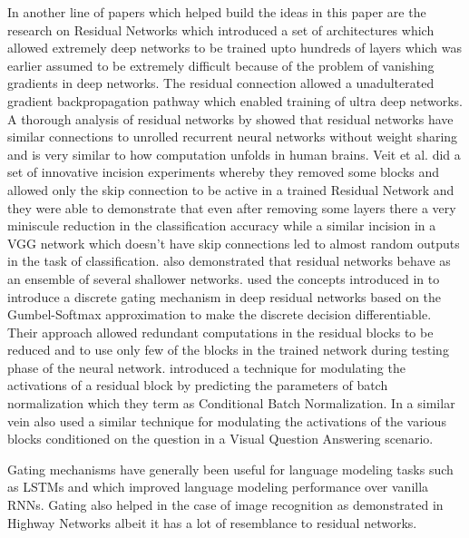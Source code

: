 In another line of papers which helped build the ideas in this paper are the research on Residual Networks \cite{he2016deep} which introduced a set of architectures which allowed extremely deep networks to be trained upto hundreds of layers which was earlier assumed to be extremely difficult because of the problem of vanishing gradients in deep networks. The residual connection allowed a unadulterated gradient backpropagation pathway which enabled training of ultra deep networks. A thorough analysis of residual networks by \cite{liao2016bridging} showed that residual networks have similar connections to unrolled recurrent neural networks without weight sharing and is very similar to how computation unfolds in human brains. Veit et al. \cite{veit2016residual} did a set of innovative incision experiments whereby they removed some blocks and allowed only the skip connection to be active in a trained Residual Network and they were able to demonstrate that even after removing some layers there a very miniscule reduction in the classification accuracy while a similar incision in a VGG network \cite{simonyan2014very} which doesn't have skip connections led to almost random outputs in the task of classification. \cite{veit2016residual} also demonstrated that residual networks behave as an ensemble of several shallower networks. \cite{veit2018adaptive} used the concepts introduced in \cite{veit2016residual} to introduce a discrete gating mechanism in deep residual networks based on the Gumbel-Softmax approximation to make the discrete decision differentiable. Their approach allowed redundant computations in the residual blocks to be reduced and to use only few of the blocks in the trained network during testing phase of the neural network. \cite{de2017modulating} introduced a technique for modulating the activations of a residual block by predicting the parameters of batch normalization which they term as Conditional Batch Normalization. In a similar vein \cite{perez2017film} also used a similar technique for modulating the activations of the various blocks conditioned on the question in a Visual Question Answering scenario.

Gating mechanisms have generally been useful for language modeling tasks such as LSTMs \cite{Hochreiter1997LSTM} and \cite{chung2014empirical} which improved language modeling performance over vanilla RNNs. Gating also helped in the case of image recognition as demonstrated in Highway Networks \cite{srivastava2015highway} albeit it has a lot of resemblance to residual networks. 

